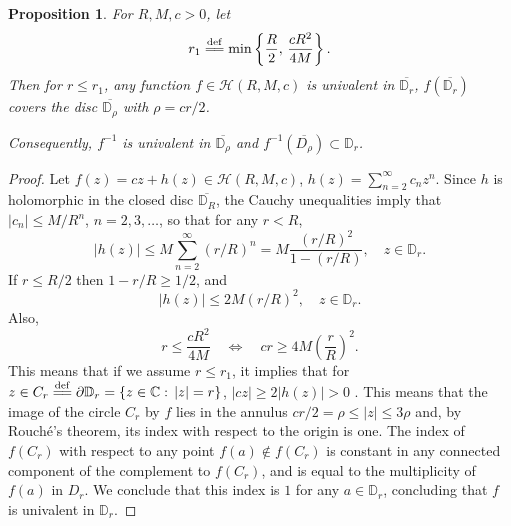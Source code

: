\documentclass[reqno,11pt]{amsart}
\theoremstyle{plain}
\newtheorem{prop}[thm]{Proposition}
\theoremstyle{definition}
\theoremstyle{remark}
\numberwithin{equation}{section}
\numberwithin{equation}{section}
\newcommand{\C}{\mathbb{C}}
\newcommand{\D}{\mathbb{D}}
\newcommand{\isdef}{\overset{\mathrm{def}}{=\joinrel=}}
\begin{document}
\begin{prop}
    \label{LemmaAux1}
For $R, M, c>0$, let 
\begin{equation}\label{r1}
r_1 \isdef \min\left\{\frac R2, \, \frac{cR^2}{4 M}\right\}.
\end{equation}
Then for $r \leq r_1$, any function $f\in \mathcal H(R, M, c)$ is univalent in $\overline{\D_r}$, 
$f(\overline{\D_r})$ covers the disc $\overline{\D_\rho}$ with $\rho = cr/2$.  

Consequently, $f^{-1}$ is univalent in $\overline{\D_{\rho}}$ and $f^{-1}(\overline{D_{\rho}})\subset \D_r$.
\end{prop}
\begin{proof}
Let $f(z) = cz + h(z)\in \mathcal H(R, M, c)$, $h(z) = \sum_{ n =2}^\infty c_n z^n$. Since $h$ is holomorphic in the closed disc $\overline{ \D_R}$, the Cauchy unequalities imply that $|c_n| \leq  M / R^n$, $n =2, 3, \dots$, so that for any $r < R$, 
$$ 
|h(z)| \leq M \sum_{ n =2}^\infty (r/R)^n =  M \frac {(r/R)^2}{1 - (r/R)}, \quad z \in \D_r.
$$
If $r\leq   R/2$ then $1 - r/R \geq 1/2$, and 
$$
|h(z)| \leq 2 M (r/R)^2, \quad  z \in \D_r.
$$
Also,
$$
r \leq  \frac {cR^2}{4 M} \quad \Leftrightarrow \quad  cr \geq 4  M \left(\frac rR\right)^2 .
$$
This means that if we assume  $r \leq r_1$, it implies that for $z \in C_r\isdef \partial \D_r=\{z\in \C:\, |z|=r\}$, $|cz| \geq 2 |h(z)|>0$ . This means that the image of the circle $C_r$ by $f$ lies in the annulus $ cr/2=\rho  \leq |z| \leq 3\rho$ and, by Rouch\'e's theorem, its index with respect to the origin is one. The index of $f(C_r)$ with respect to any point $f(a)\notin f(C_r)$ is constant in any connected component of the complement to $f(C_r)$, and is equal to the multiplicity of $f(a)$ in $D_r$. We conclude that this index is $1$ for any $a\in \D_r$, concluding that $f$ is univalent in $\D_r$. 
\end{proof}
\end{document}
